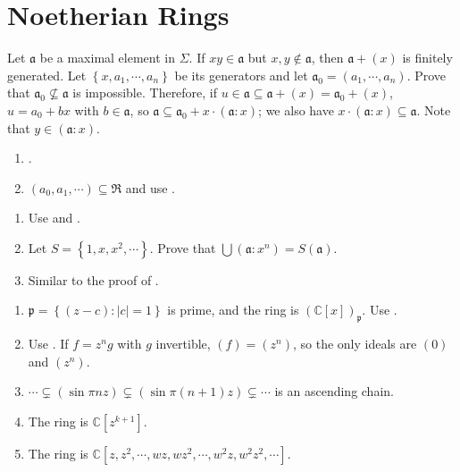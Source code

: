 \section{Noetherian Rings}

\begin{exercise}\label{ex7.1}
	Let $\mathfrak{a}$ be a maximal element in $\Sigma$. If $xy\in\mathfrak{a}$ but $x,y\notin\mathfrak{a}$, then $\mathfrak{a}+(x)$ is finitely generated. Let $\left\{x,a_1,\cdots,a_n\right\}$ be its generators and let $\mathfrak{a}_0=\left(a_1,\cdots,a_n\right)$. Prove that $\mathfrak{a}_0\nsubseteq\mathfrak{a}$ is impossible. Therefore, if $u\in\mathfrak{a}\subseteq\mathfrak{a}+(x)=\mathfrak{a}_0+(x)$, $u=a_0+bx$ with $b\in\mathfrak{a}$, so $\mathfrak{a}\subseteq\mathfrak{a}_0+x\cdot(\mathfrak{a}:x)$; we also have $x\cdot(\mathfrak{a}:x)\subseteq\mathfrak{a}$. Note that $y\in(\mathfrak{a}:x)$.
\end{exercise}

\begin{exercise}\label{ex7.2}
	\begin{enumerate}
		\item[$\Rightarrow$:] .
		\item[$\Leftarrow$:] $\left(a_0,a_1,\cdots\right)\subseteq\mathfrak{R}$ and use .
	\end{enumerate}
\end{exercise}

\begin{exercise}\label{ex7.3}
	\begin{enumerate}
		\item[(i) $\Rightarrow$ (ii)] Use  and .
		\item[(ii) $\Rightarrow$ (iii)] Let $S=\left\{1,x,x^2,\cdots\right\}$. Prove that $\bigcup\left(\mathfrak{a}:x^n\right)=S(\mathfrak{a})$.
		\item[(iii) $\Rightarrow$ (i)] Similar to the proof of .
	\end{enumerate}
\end{exercise}

\begin{exercise}\label{ex7.4}
	\begin{enumerate}[label=(\roman*),ref=\theexercise(\roman*)]
		\item $\mathfrak{p}=\left\{(z-c):|c|=1\right\}$ is prime, and the ring is $(\mathbb{C}[x])_\mathfrak{p}$. Use .
		\item Use . If $f=z^ng$ with $g$ invertible, $(f)=\left(z^n\right)$, so the only ideals are $(0)$ and $\left(z^n\right)$.
		\item $\cdots\subsetneq(\sin\pi nz)\subsetneq(\sin\pi(n+1)z)\subsetneq\cdots$ is an ascending chain.
		\item The ring is $\mathbb{C}\left[z^{k+1}\right]$.
		\item The ring is $\mathbb{C}\left[z,z^2,\cdots,wz,wz^2,\cdots,w^2z,w^2z^2,\cdots\right]$.
	\end{enumerate}
\end{exercise}

